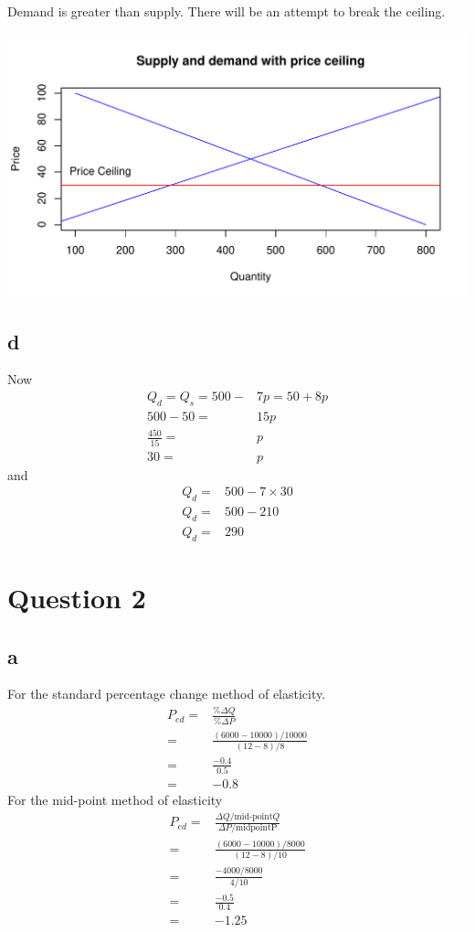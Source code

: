 \documentclass[12pt, a4paper, oneside]{article}\usepackage{graphicx, color}
\makeatletter
\def\maxwidth{ %
  \ifdim\Gin@nat@width>\linewidth
    \linewidth
  \else
    \Gin@nat@width
  \fi
}
\newenvironment{knitrout}{}{} %
\makeatother
\begin{document}
Demand is greater than supply.  There will be an attempt to break the ceiling.  

\begin{knitrout}
\color{fgcolor}
\includegraphics[width=\maxwidth]{figure/ceiling} 

\end{knitrout}

\subsection*{d}
Now
\begin{align*}
Q_d = Q_s = 500 -& 7p = 50 + 8p\\
500 - 50 =& 15p\\
\frac{450}{15} =& p\\
30 =& p
\end{align*}
and 
\begin{align*}
Q_d =& 500 - 7 \times 30\\
Q_d =& 500 - 210\\
Q_d =& 290
\end{align*}

\section{Question 2}
\subsection*{a}
For the standard percentage change method of elasticity. 
\begin{align*}
P_{ed} =& \frac{\% \Delta Q}{\% \Delta P}\\
=& \frac{(6000-10000)/10000}{(12-8)/8}\\
=& \frac{-0.4}{0.5}\\
=& -0.8
\end{align*}
For the mid-point method of elasticity
\begin{align*}
P_{ed} =& \frac{\Delta Q/\text{mid-point} Q}{\Delta P/ \text{midpoint{P}}}\\
=& \frac{(6000-10000)/8000}{(12-8)/10}\\
=& \frac{-4000/8000}{4/10}\\
=& \frac{-0.5}{0.4}\\
=& -1.25
\end{align*}
\end{document}
